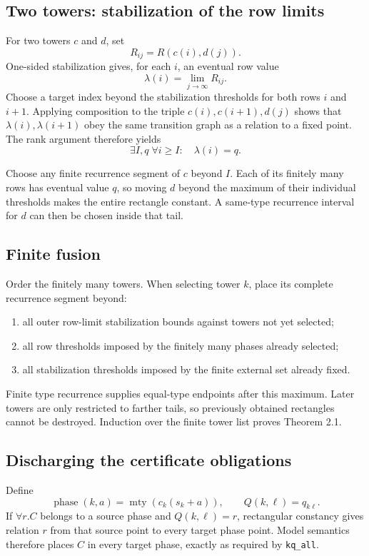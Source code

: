\documentclass[11pt]{article}
\newcommand{\mty}{\operatorname{mty}}
\begin{document}
\subsection{Two towers: stabilization of the row limits}

For two towers $c$ and $d$, set
\[
  R_{ij}=R(c(i),d(j)).
\]
One-sided stabilization gives, for each $i$, an eventual row value
\[
  \lambda(i)=\lim_{j\to\infty}R_{ij}.
\]
Choose a target index beyond the stabilization thresholds for both rows $i$ and $i+1$.
Applying composition to the triple $c(i),c(i+1),d(j)$ shows that
$\lambda(i),\lambda(i+1)$ obey the same transition graph as a relation to a fixed point.
The rank argument therefore yields
\[
  \exists I,q\;\forall i\geq I:\quad \lambda(i)=q.
\]

Choose any finite recurrence segment of $c$ beyond $I$. Each of its finitely many rows has
eventual value $q$, so moving $d$ beyond the maximum of their individual thresholds makes
the entire rectangle constant. A same-type recurrence interval for $d$ can then be chosen
inside that tail.

\subsection{Finite fusion}

Order the finitely many towers. When selecting tower $k$, place its complete recurrence
segment beyond:

\begin{enumerate}
  \item all outer row-limit stabilization bounds against towers not yet selected;
  \item all row thresholds imposed by the finitely many phases already selected;
  \item all stabilization thresholds imposed by the finite external set already fixed.
\end{enumerate}

Finite type recurrence supplies equal-type endpoints after this maximum. Later towers are
only restricted to farther tails, so previously obtained rectangles cannot be destroyed.
Induction over the finite tower list proves Theorem 2.1.

\subsection{Discharging the certificate obligations}

Define
\[
  \operatorname{phase}(k,a)=\mty(c_k(s_k+a)),\qquad
  Q(k,\ell)=q_{k\ell}.
\]
If $\forall r.C$ belongs to a source phase and $Q(k,\ell)=r$, rectangular constancy gives
relation $r$ from that source point to every target phase point. Model semantics therefore
places $C$ in every target phase, exactly as required by \texttt{kq\_all}.
\end{document}
